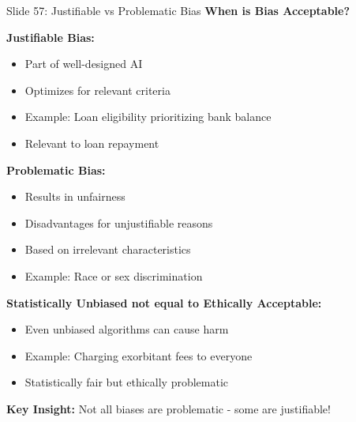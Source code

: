 \documentclass[8pt]{beamer}
\begin{document}
	\begin{frame}{Slide 57: Justifiable vs Problematic Bias}
		\fontsize{6.5}{7.5}\selectfont
		\textbf{When is Bias Acceptable?}
		
		\vspace{0.1cm}
		\textbf{Justifiable Bias:}
		\begin{itemize}
			\item Part of well-designed AI
			\item Optimizes for relevant criteria
			\item Example: Loan eligibility prioritizing bank balance
			\item Relevant to loan repayment
		\end{itemize}
		
		\vspace{0.1cm}
		\textbf{Problematic Bias:}
		\begin{itemize}
			\item Results in unfairness
			\item Disadvantages for unjustifiable reasons
			\item Based on irrelevant characteristics
			\item Example: Race or sex discrimination
		\end{itemize}
		
		\vspace{0.1cm}
		\textbf{Statistically Unbiased not equal to Ethically Acceptable:}
		\begin{itemize}
			\item Even unbiased algorithms can cause harm
			\item Example: Charging exorbitant fees to everyone
			\item Statistically fair but ethically problematic
		\end{itemize}
		
		\textcolor{myblue}{\textbf{Key Insight:}} Not all biases are \textcolor{myblue}{problematic} - some are justifiable!
	\end{frame}
	
\end{document}
